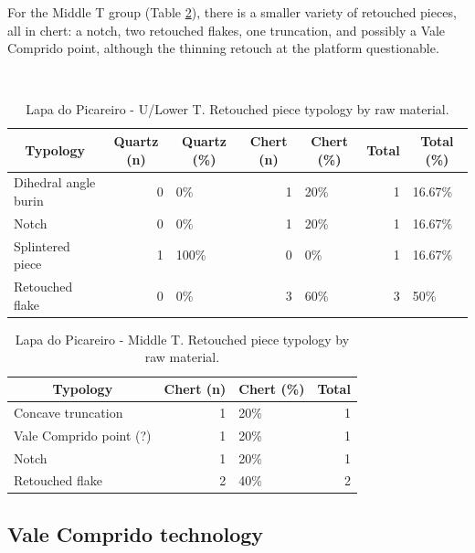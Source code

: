 \documentclass[12pt,twoside]{reedthesis}
\begin{document}
For the Middle T group (Table \ref{tab:retouchLP2}), there is a smaller variety of retouched pieces, all in chert: a notch, two retouched flakes, one truncation, and possibly a Vale Comprido point, although the thinning retouch at the platform questionable.

~
\begin{table}[!h]

\caption{\label{tab:retouchLP1}Lapa do Picareiro - U/Lower T. Retouched piece typology by raw material.}
\centering
\fontsize{9}{11}\selectfont
\begin{tabular}[t]{lrlrlrl}
\toprule
\multicolumn{1}{c}{\textbf{Typology}} & \multicolumn{1}{c}{\textbf{Quartz (n)}} & \multicolumn{1}{c}{\textbf{Quartz (\%)}} & \multicolumn{1}{c}{\textbf{Chert (n)}} & \multicolumn{1}{c}{\textbf{Chert (\%)}} & \multicolumn{1}{c}{\textbf{Total}} & \multicolumn{1}{c}{\textbf{Total (\%)}}\\
\midrule
Dihedral angle burin & 0 & 0\% & 1 & 20\% & 1 & 16.67\%\\
Notch & 0 & 0\% & 1 & 20\% & 1 & 16.67\%\\
Splintered piece & 1 & 100\% & 0 & 0\% & 1 & 16.67\%\\
Retouched flake & 0 & 0\% & 3 & 60\% & 3 & 50\%\\
\bottomrule
\end{tabular}
\end{table}
\begin{table}[!h]

\caption{\label{tab:retouchLP2}Lapa do Picareiro - Middle T. Retouched piece typology by raw material.}
\centering
\fontsize{9}{11}\selectfont
\begin{tabular}[t]{lrlr}
\toprule
\multicolumn{1}{c}{\textbf{Typology}} & \multicolumn{1}{c}{\textbf{Chert (n)}} & \multicolumn{1}{c}{\textbf{Chert (\%)}} & \multicolumn{1}{c}{\textbf{Total}}\\
\midrule
Concave truncation & 1 & 20\% & 1\\
Vale Comprido point (?) & 1 & 20\% & 1\\
Notch & 1 & 20\% & 1\\
Retouched flake & 2 & 40\% & 2\\
\bottomrule
\end{tabular}
\end{table}
\hypertarget{vale-comprido-technology}{%
\subsection{Vale Comprido technology}\label{vale-comprido-technology}}
\end{document}

